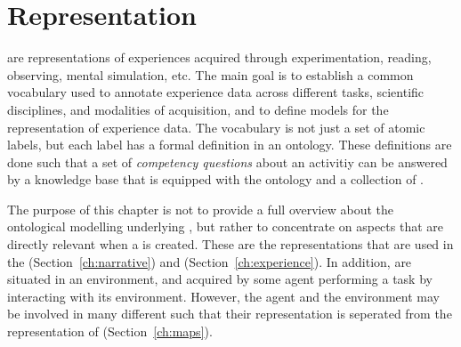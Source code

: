 \chapter{Representation}
\label{chap:represenation}

\neems are representations of experiences acquired through experimentation, reading, observing, mental simulation, etc.
The main goal is to establish a common vocabulary used to annotate experience data across different tasks, scientific disciplines, and modalities of acquisition, and to define models for the representation of experience data.
The vocabulary is not just a set of atomic labels, but each label has a formal definition in an ontology.
These definitions are done such that a set of \emph{competency questions} about an activitiy can be answered by a knowledge base that is equipped with the ontology and a collection of \neems.

The purpose of this chapter is not to provide a full overview about the ontological modelling underlying \neems, but rather to concentrate on aspects that are directly relevant when a \neem is created.
These are the representations that are used in the \neemnar (Section~\ref{ch:narrative}) and \neemexp (Section~\ref{ch:experience}).
In addition, \neems are situated in an environment, and acquired by some agent performing a task by interacting with its environment.
However, the agent and the environment may be involved in many different \neems such that their representation is seperated from the representation of \neems (Section~\ref{ch:maps}).


\newpage


\newpage


\newpage




